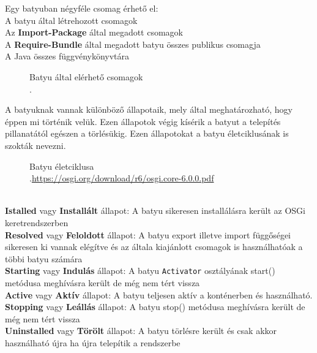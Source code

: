 Egy batyuban négyféle csomag érhető el:
\\A batyu által létrehozott csomagok
\\Az \textbf{Import-Package} által megadott csomagok
\\A \textbf{Require-Bundle} által megadott batyu összes publikus csomagja
\\A Java összes függvénykönyvtára
\\
\begin{figure}[h]
  \centering
  \caption[Batyuk elerese]%
  {Batyu által elérhető csomagok\\
  {\white .}\hfill\url{}}
  \label{fig:BatyukElerese}
\end{figure}
 A batyuknak vannak különböző állapotaik, mely által meghatározható, hogy éppen mi történik velük. Ezen állapotok végig kísérik a batyut a telepítés pillanatától egészen a törlésükig. Ezen állapotokat a batyu életciklusának is szokták nevezni.
\\
\begin{figure}[h]
  \centering
  \caption[Batyuk eletciklusa]%
  {Batyu életciklusa\\
  {\white .}\hfill\url{https://osgi.org/download/r6/osgi.core-6.0.0.pdf}}
  \label{fig:BatyukEletciklusa}
\end{figure}
\\\textbf{Istalled} vagy \textbf{Installált} állapot: A batyu sikeresen installálásra került az OSGi keretrendszerben
\\\textbf{Resolved} vagy \textbf{Feloldott} állapot: A batyu export illetve import függőségei sikeresen ki vannak elégítve és az általa kiajánlott csomagok is használhatóak a többi batyu számára
\\\textbf{Starting} vagy \textbf{Indulás} állapot: A batyu \texttt{Activator} osztályának start() metódusa meghívásra került de még nem tért vissza
\\\textbf{Active} vagy \textbf{Aktív} állapot: A batyu teljesen aktív a konténerben és használható.
\\\textbf{Stopping} vagy \textbf{Leállás} állapot: A batyu stop() metódusa meghívásra került de még nem tért vissza
\\\textbf{Uninstalled} vagy \textbf{Törölt} állapot: A batyu törlésre került és csak akkor használható újra ha újra telepítik a rendszerbe
\\

